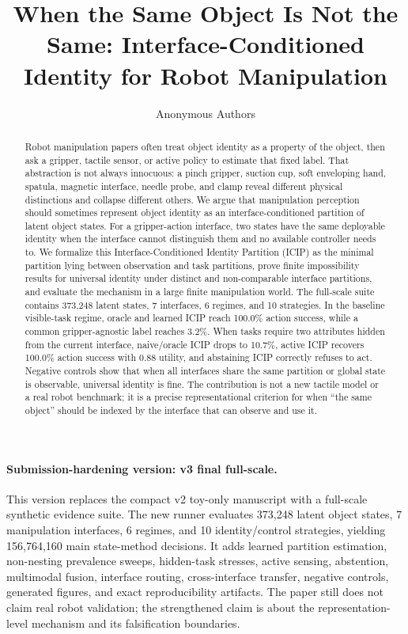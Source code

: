 \documentclass{article}
\title{When the Same Object Is Not the Same: Interface-Conditioned Identity for Robot Manipulation}
\author{Anonymous Authors}
\newcommand{\icip}{\textsc{ICIP}}
\begin{document}
\maketitle

\paragraph{Submission-hardening version: v3 final full-scale.}
This version replaces the compact v2 toy-only manuscript with a full-scale synthetic evidence suite. The new runner evaluates 373,248 latent object states, 7 manipulation interfaces, 6 regimes, and 10 identity/control strategies, yielding 156,764,160 main state-method decisions. It adds learned partition estimation, non-nesting prevalence sweeps, hidden-task stresses, active sensing, abstention, multimodal fusion, interface routing, cross-interface transfer, negative controls, generated figures, and exact reproducibility artifacts. The paper still does not claim real robot validation; the strengthened claim is about the representation-level mechanism and its falsification boundaries.

\begin{abstract}
Robot manipulation papers often treat object identity as a property of the object, then ask a gripper, tactile sensor, or active policy to estimate that fixed label.
That abstraction is not always innocuous: a pinch gripper, suction cup, soft enveloping hand, spatula, magnetic interface, needle probe, and clamp reveal different physical distinctions and collapse different others.
We argue that manipulation perception should sometimes represent object identity as an interface-conditioned partition of latent object states.
For a gripper-action interface, two states have the same deployable identity when the interface cannot distinguish them and no available controller needs to.
We formalize this Interface-Conditioned Identity Partition (\icip) as the minimal partition lying between observation and task partitions, prove finite impossibility results for universal identity under distinct and non-comparable interface partitions, and evaluate the mechanism in a large finite manipulation world.
The full-scale suite contains 373,248 latent states, 7 interfaces, 6 regimes, and 10 strategies.
In the baseline visible-task regime, oracle and learned \icip{} reach 100.0\% action success, while a common gripper-agnostic label reaches 3.2\%.
When tasks require two attributes hidden from the current interface, naive/oracle \icip{} drops to 10.7\%, active \icip{} recovers 100.0\% action success with 0.88 utility, and abstaining \icip{} correctly refuses to act.
Negative controls show that when all interfaces share the same partition or global state is observable, universal identity is fine.
The contribution is not a new tactile model or a real robot benchmark; it is a precise representational criterion for when ``the same object'' should be indexed by the interface that can observe and use it.
\end{abstract}
\end{document}
